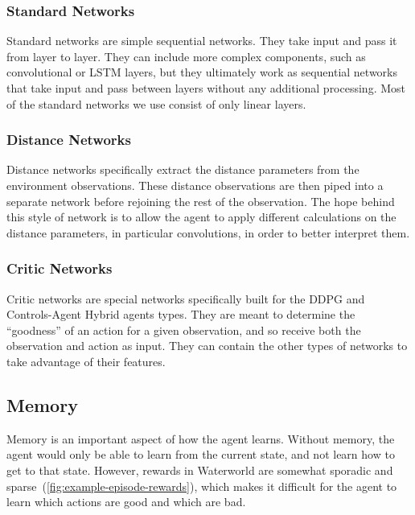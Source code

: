 \subsubsection{Standard Networks}
Standard networks are simple sequential networks.
They take input and pass it from layer to layer.
They can include more complex components, such as convolutional or LSTM layers, but
they ultimately work as sequential networks that take input and pass between layers
without any additional processing.
Most of the standard networks we use consist of only linear layers.

\subsubsection{Distance Networks}
Distance networks specifically extract the distance parameters from the environment
observations.
These distance observations are then piped into a separate network before rejoining the
rest of the observation.
The hope behind this style of network is to allow the agent to apply different
calculations on the distance parameters, in particular convolutions, in order to better
interpret them.

\subsubsection{Critic Networks}
Critic networks are special networks specifically built for the DDPG and
Controls-Agent Hybrid agents types.
They are meant to determine the ``goodness'' of an action for a given observation,
and so receive both the observation and action as input.
They can contain the other types of networks to take advantage of their features.

\subsection{Memory}\label{subsec:memory}
Memory is an important aspect of how the agent learns.
Without memory, the agent would only be able to learn from the current state, and
not learn how to get to that state.
However, rewards in Waterworld are somewhat sporadic and
sparse~(\autoref{fig:example-episode-rewards}), which makes it difficult for the
agent to learn which actions are good and which are bad.

